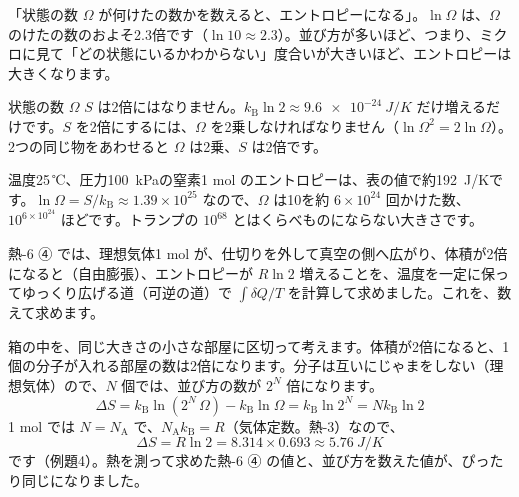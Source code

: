 \begin{phyomi}[$S=k_{\mathrm B}\ln\Omega$]
「状態の数 $\Omega$ が何けたの数かを数えると、エントロピーになる」。$\ln\Omega$ は、$\Omega$ のけたの数のおよそ2.3倍です（$\ln10\approx2.3$）。並び方が多いほど、つまり、ミクロに見て「どの状態にいるかわからない」度合いが大きいほど、エントロピーは大きくなります。
\end{phyomi}

\begin{phbaisuru}{状態の数 $\Omega$}
$S$ は2倍にはなりません。$k_{\mathrm B}\ln2\approx\qty{9.6e-24}{J/K}$ だけ増えるだけです。$S$ を2倍にするには、$\Omega$ を2乗しなければなりません（$\ln\Omega^2=2\ln\Omega$）。2つの同じ物をあわせると $\Omega$ は2乗、$S$ は2倍です。
\end{phbaisuru}

\begin{phmijika}
温度25\,℃、圧力\qty{100}{kPa}の窒素1 mol のエントロピーは、表の値で約\qty{192}{J/K}です。$\ln\Omega=S/k_{\mathrm B}\approx1.39\times10^{25}$ なので、$\Omega$ は10を約 $6\times10^{24}$ 回かけた数、$10^{6\times10^{24}}$ ほどです。トランプの $10^{68}$ とはくらべものにならない大きさです。
\end{phmijika}

熱-6 ④ では、理想気体1 mol が、仕切りを外して真空の側へ広がり、体積が2倍になると（自由膨張）、エントロピーが $R\ln2$ 増えることを、温度を一定に保ってゆっくり広げる道（可逆の道）で $\int\delta Q/T$ を計算して求めました。これを、数えて求めます。

箱の中を、同じ大きさの小さな部屋に区切って考えます。体積が2倍になると、1個の分子が入れる部屋の数は2倍になります。分子は互いにじゃまをしない（理想気体）ので、$N$ 個では、並び方の数が $2^N$ 倍になります。
\[\Delta S=k_{\mathrm B}\ln(2^N\,\Omega)-k_{\mathrm B}\ln\Omega=k_{\mathrm B}\ln2^N=Nk_{\mathrm B}\ln2\]
1 mol では $N=N_{\mathrm A}$ で、$N_{\mathrm A}k_{\mathrm B}=R$（気体定数。熱-3）なので、
\[\Delta S=R\ln2=8.314\times0.693\approx\qty{5.76}{J/K}\]
です（例題4）。熱を測って求めた熱-6 ④ の値と、並び方を数えた値が、ぴったり同じになりました。

\begin{phflow}[並び方の数からエントロピーの変化へ]
\end{phflow}

